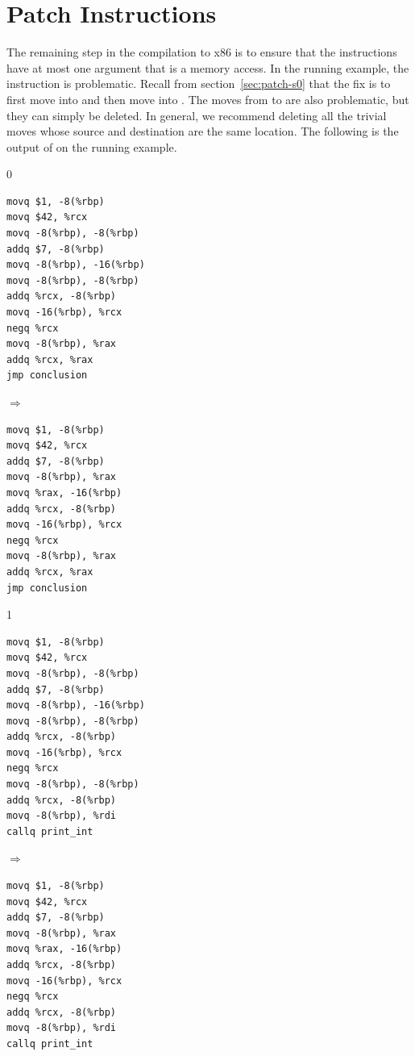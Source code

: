 \documentclass[7x10]{TimesAPriori_MIT}%
\def\racketEd{0}
\def\pythonEd{1}
\def\edition{1}
\newcommand{\pythonColor}[0]{}
\numberwithin{theorem}{chapter}
\numberwithin{definition}{chapter}
\numberwithin{equation}{chapter}
\begin{document}
\section{Patch Instructions}
\label{sec:patch-instructions}

The remaining step in the compilation to x86 is to ensure that the
instructions have at most one argument that is a memory access.
%
In the running example, the instruction  is problematic. Recall from section~\ref{sec:patch-s0}
  that the fix is to first move  into  and
  then move  into .
%
The moves from  to  are also
problematic, but they can simply be deleted. In general, we recommend
deleting all the trivial moves whose source and destination are the
same location.
%
The following is the output of  on the
running example.
\begin{center}
{\if\edition\racketEd      
\begin{minipage}{0.35\textwidth}
\begin{lstlisting}
movq $1, -8(%rbp)
movq $42, %rcx
movq -8(%rbp), -8(%rbp)
addq $7, -8(%rbp)
movq -8(%rbp), -16(%rbp)
movq -8(%rbp), -8(%rbp)
addq %rcx, -8(%rbp)
movq -16(%rbp), %rcx
negq %rcx
movq -8(%rbp), %rax
addq %rcx, %rax
jmp conclusion
\end{lstlisting}
\end{minipage}
$\Rightarrow\qquad$
\begin{minipage}{0.45\textwidth}
\begin{lstlisting}
movq $1, -8(%rbp)
movq $42, %rcx
addq $7, -8(%rbp)
movq -8(%rbp), %rax
movq %rax, -16(%rbp)
addq %rcx, -8(%rbp)
movq -16(%rbp), %rcx
negq %rcx
movq -8(%rbp), %rax
addq %rcx, %rax
jmp conclusion
\end{lstlisting}
\end{minipage}
\fi}
{\if\edition\pythonEd\pythonColor
\begin{minipage}{0.35\textwidth}
\begin{lstlisting}
movq $1, -8(%rbp)
movq $42, %rcx
movq -8(%rbp), -8(%rbp)
addq $7, -8(%rbp)
movq -8(%rbp), -16(%rbp)
movq -8(%rbp), -8(%rbp)
addq %rcx, -8(%rbp)
movq -16(%rbp), %rcx
negq %rcx
movq -8(%rbp), -8(%rbp)
addq %rcx, -8(%rbp)
movq -8(%rbp), %rdi
callq print_int    
\end{lstlisting}
\end{minipage}
$\Rightarrow\qquad$
\begin{minipage}{0.45\textwidth}
\begin{lstlisting}
movq $1, -8(%rbp)
movq $42, %rcx
addq $7, -8(%rbp)
movq -8(%rbp), %rax
movq %rax, -16(%rbp)
addq %rcx, -8(%rbp)
movq -16(%rbp), %rcx
negq %rcx
addq %rcx, -8(%rbp)
movq -8(%rbp), %rdi
callq print_int    
\end{lstlisting}
\end{minipage}
\fi}
\end{center}
\end{document}
